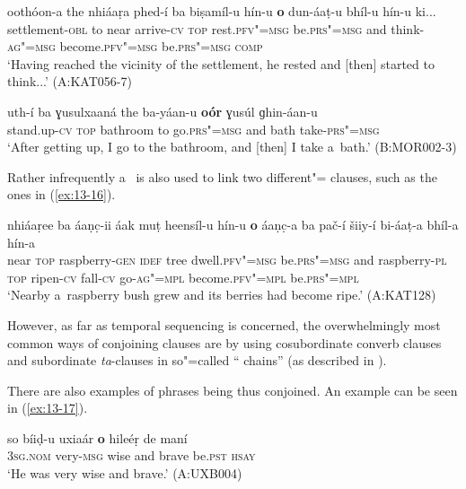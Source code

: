 \begin{exe}
\ex
\label{ex:13-14}
\gll oothóon-a the nhiáaṛa phed-í ba {\ob}biṣamíl-u hín-u \textbf{o} dun-áaṭ-u bhíl-u hín-u{\cb} ki...\\
settlement-\textsc{obl} to near arrive-\textsc{cv} \textsc{top} rest.\textsc{pfv"=msg} be.\textsc{prs"=msg} and think-\textsc{ag"=msg} become.\textsc{pfv"=msg} be.\textsc{prs"=msg } \textsc{comp} \\
\glt `Having reached the vicinity of the settlement, he rested and [then] started to think...' (A:KAT056-7)

\ex
\label{ex:13-15}
\gll uth-í ba {\ob}ɣusulxaaná the ba-yáan-u \textbf{oór} ɣusúl ɡhin-áan-u{\cb} \\
stand.up-\textsc{cv} \textsc{top} bathroom to go.\textsc{prs"=msg}  and bath take-\textsc{prs"=msg} \\
\glt `After getting up, I go to the bathroom, and [then] I take a~bath.' \newline \mbox{(B:MOR002-3)}
\end{exe}

Rather infrequently a~ is also used to link two different"= clauses, such as the ones in (\ref{ex:13-16}).

\ea
\label{ex:13-16}
\gll nhiáaṛee ba {\ob}áaṇc̣-ii áak muṭ heensíl-u hín-u \textbf{o} áaṇc̣-a ba pač-í šiiy-í bi-áaṭ-a bhíl-a hín-a{\cb}\\
near \textsc{top} raspberry-\textsc{gen} \textsc{idef} tree dwell.\textsc{pfv"=msg}  be.\textsc{prs"=msg} and raspberry-\textsc{pl} \textsc{top} ripen-\textsc{cv} fall-\textsc{cv} go-\textsc{ag"=mpl} become.\textsc{pfv"=mpl} be.\textsc{prs"=mpl}\\
\glt `Nearby a~raspberry bush grew and its berries had become ripe.' (A:KAT128) 
\z

However, as far as temporal sequencing is concerned, the overwhelmingly most common ways of conjoining clauses are by using cosubordinate converb clauses and subordinate \textit{ta}-clauses in so"=called `` chains'' (as described in ).


There are also examples of   phrases being thus conjoined. An example can be seen in (\ref{ex:13-17}).

\begin{exe}
\ex
\label{ex:13-17}
\gll so bíiḍ-u {\ob}uxiaár \textbf{o} hileéṛ{\cb} de maní  \\
\textsc{3sg.nom} very-\textsc{msg} wise and brave be.\textsc{pst} \textsc{hsay} \\
\glt `He was very wise and brave.' (A:UXB004) 
\end{exe}

